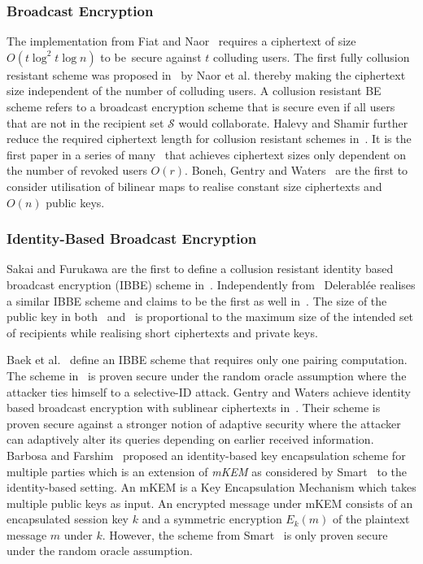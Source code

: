\subsubsection{Broadcast Encryption}
The implementation from Fiat and Naor~\cite{art:FiatN93} requires a ciphertext of size  $O \left( t \log^2 t \log n \right)$ to be~secure against $t$ colluding users. The first fully collusion resistant scheme was proposed in~\cite{art:NaorNL01} by Naor et al. thereby making the ciphertext size independent of the number of colluding users. A collusion resistant BE scheme refers to a broadcast encryption scheme that is secure even if all users that are not in the recipient set $\mathcal{S}$ would collaborate. Halevy and Shamir further reduce the required ciphertext length for collusion resistant schemes in~\cite{art:HalevyS02}. It is the first paper in a series of many~\cite{art:DodisF02,art:GoodrichST04,art:LewkoSW08} that achieves ciphertext sizes only dependent on the number of revoked users $O \left( r \right)$. Boneh, Gentry and Waters~\cite{art:BonehBG05} are the first to consider utilisation of bilinear maps to realise constant size ciphertexts and $O \left( n \right)$ public keys.

\subsubsection{Identity-Based Broadcast Encryption}
Sakai and Furukawa are the first to define a collusion resistant identity based broadcast encryption (IBBE) scheme in~\cite{art:SakaiF07}. Independently from~\cite{art:SakaiF07} Delerabl\'{e}e realises a similar IBBE scheme and claims to be the first as well in~\cite{art:Delerablee07}.  The size of the public key in both~\cite{art:SakaiF07} and~\cite{art:Delerablee07} is proportional to the maximum size of the intended set of recipients while realising short ciphertexts and private keys. 

Baek et al.~\cite{art:BaekNSS04} define an IBBE scheme that requires only one pairing computation. The scheme in~\cite{art:BaekNSS04} is proven secure under the random oracle assumption where the attacker ties himself to a selective-ID attack. Gentry and Waters achieve identity based broadcast encryption with sublinear ciphertexts in~\cite{art:GentryW08}. Their scheme is proven secure against a stronger notion of adaptive security where the attacker can adaptively alter its queries depending on earlier received information. Barbosa and Farshim~\cite{art:BarbosaF05} proposed an identity-based key encapsulation scheme for multiple parties which is an extension of \textit{mKEM} as considered by Smart~\cite{art:Smart04} to the identity-based setting. An mKEM is a Key Encapsulation Mechanism which takes multiple public keys as input. An encrypted message under mKEM consists of an encapsulated session key $k$ and a symmetric encryption $E_k \left( m \right)$ of the plaintext message $m$ under $k$. However, the scheme from Smart~\cite{art:Smart04} is only proven secure under the random oracle assumption.

